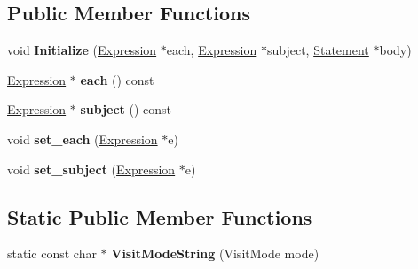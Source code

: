 \subsection*{Public Member Functions}
\begin{DoxyCompactItemize}
\item 
void {\bfseries Initialize} (\hyperlink{classv8_1_1internal_1_1_expression}{Expression} $\ast$each, \hyperlink{classv8_1_1internal_1_1_expression}{Expression} $\ast$subject, \hyperlink{classv8_1_1internal_1_1_statement}{Statement} $\ast$body)\hypertarget{classv8_1_1internal_1_1_for_each_statement_a313c15cf34ee25e46b38d29f98e2062c}{}\label{classv8_1_1internal_1_1_for_each_statement_a313c15cf34ee25e46b38d29f98e2062c}

\item 
\hyperlink{classv8_1_1internal_1_1_expression}{Expression} $\ast$ {\bfseries each} () const \hypertarget{classv8_1_1internal_1_1_for_each_statement_a15dbcb73f9077dbad09fb8c3c945adda}{}\label{classv8_1_1internal_1_1_for_each_statement_a15dbcb73f9077dbad09fb8c3c945adda}

\item 
\hyperlink{classv8_1_1internal_1_1_expression}{Expression} $\ast$ {\bfseries subject} () const \hypertarget{classv8_1_1internal_1_1_for_each_statement_af3cbbe56941d9c7c8f83456e3ee9189e}{}\label{classv8_1_1internal_1_1_for_each_statement_af3cbbe56941d9c7c8f83456e3ee9189e}

\item 
void {\bfseries set\+\_\+each} (\hyperlink{classv8_1_1internal_1_1_expression}{Expression} $\ast$e)\hypertarget{classv8_1_1internal_1_1_for_each_statement_a0097ed4a2e63fba54304681e9b1182f4}{}\label{classv8_1_1internal_1_1_for_each_statement_a0097ed4a2e63fba54304681e9b1182f4}

\item 
void {\bfseries set\+\_\+subject} (\hyperlink{classv8_1_1internal_1_1_expression}{Expression} $\ast$e)\hypertarget{classv8_1_1internal_1_1_for_each_statement_ae3493290d16a1e37690747661f71ab86}{}\label{classv8_1_1internal_1_1_for_each_statement_ae3493290d16a1e37690747661f71ab86}

\end{DoxyCompactItemize}
\subsection*{Static Public Member Functions}
\begin{DoxyCompactItemize}
\item 
static const char $\ast$ {\bfseries Visit\+Mode\+String} (Visit\+Mode mode)\hypertarget{classv8_1_1internal_1_1_for_each_statement_a6b5cec4fb7fc8014471908926665e4f6}{}\label{classv8_1_1internal_1_1_for_each_statement_a6b5cec4fb7fc8014471908926665e4f6}

\end{DoxyCompactItemize}
